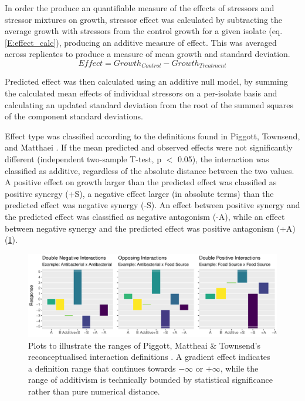 \documentclass[final,1p,times]{elsarticle}
\begin{document}
In order the produce an quantifiable measure of the effects of stressors and stressor mixtures on growth, stressor effect was calculated by subtracting the average growth with stressors from the control growth for a given isolate (eq. \ref{E:effect_calc}), producing an additive measure of effect. This was averaged across replicates to produce a measure of mean growth and standard deviation.
\begin{equation}
Effect = Growth_{Control} - Growth_{Treatment}
\label{E:effect_calc}
\end{equation}

Predicted effect was then calculated using an additive null model, by summing the calculated mean effects of individual stressors on a per-isolate basis and calculating an updated standard deviation from the root of the summed squares of the component standard deviations. 

Effect type was classified according to the definitions found in Piggott, Townsend, and Matthaei \cite{Piggott2015}. If the mean predicted and observed effects were not significantly different (independent two-sample T-test, p $<$ 0.05), the interaction was classified as additive, regardless of the absolute distance between the two values. A positive effect on growth larger than the predicted effect was classified as positive synergy (+S), a negative effect larger (in absolute terms) than the predicted effect was negative synergy (-S). An effect between positive synergy and the predicted effect was classified as negative antagonism (-A), while an effect between negative synergy and the predicted effect was positive antagonism (+A) (\cref{fig:interaction_ranges}). 

\begin{figure}[H]
    \centering
    \includegraphics[width = \textwidth]{Scripts/Results/Plot_Interactions_Illustrative.pdf}
    \caption{Plots to illustrate the ranges of Piggott, Mattheai \& Townsend's reconceptualised interaction definitions \cite{Piggott2015}. A gradient effect indicates a definition range that continues towards $-\infty$ or $+\infty$, while the range of additivism is technically bounded by statistical significance rather than pure numerical distance.}
    \label{fig:interaction_ranges}
\end{figure}
\end{document}

